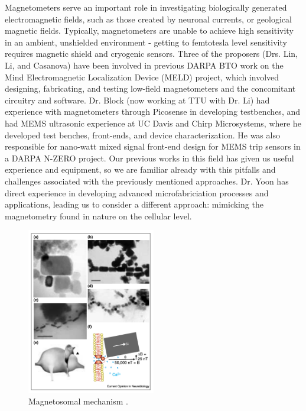 Magnetometers serve an important role in investigating biologically generated electromagnetic fields, such as those created by neuronal currents, or geological magnetic fields. Typically, magnetometers are unable to achieve high sensitivity in an ambient, unshielded environment - getting to femtotesla level sensitivity requires magnetic shield and cryogenic sensors. Three of the proposers (Drs. Lin, Li, and Casanova) have been involved in previous DARPA BTO work on the Mind Electromagnetic Localization Device (MELD) project, which involved designing, fabricating, and testing low-field magnetometers and the concomitant circuitry and software. Dr. Block (now working at TTU with Dr. Li) had experience with magnetometers through Picosense in developing testbenches, and had MEMS ultrasonic experience at UC Davis and Chirp Microsystems, where he developed test benches, front-ends, and device characterization. He was also responsible for nano-watt mixed signal front-end design for MEMS trip sensors in a DARPA N-ZERO project. Our previous works in this field has given us useful experience and equipment, so we are familiar already with this pitfalls and challenges associated with the previously mentioned approaches. Dr. Yoon has direct experience in developing advanced microfabriciation processes and applications\cite{yoon2003reduced,yoon2006multidirectional}, leading us to consider a different approach: mimicking the magnetometry found in nature on the cellular level.

\begin{figure}[H]
\centering
\includegraphics[width=0.5\textwidth]{kirsh2001}
\caption{Magnetosomal mechanism \cite{kirschvink2001magnetite}.}
\label{fig:magnetosome}
\end{figure}

